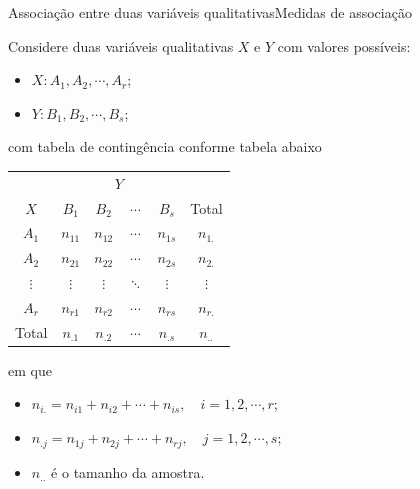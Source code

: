 \documentclass[
  10pt,
  ignorenonframetext,
]{beamer}
\begin{document}
\begin{frame}{Associação entre duas variáveis
qualitativas\newline Medidas de associação}
\protect\hypertarget{associauxe7uxe3o-entre-duas-variuxe1veis-qualitativasmedidas-de-associauxe7uxe3o-1}{}
\scriptsize

Considere duas variáveis qualitativas \(X\) e \(Y\) com valores
possíveis:

\begin{itemize}
    \item $X: A_1, A_2, \cdots, A_r$;
    \item $Y: B_1, B_2, \cdots, B_s$;
\end{itemize}

com tabela de contingência conforme tabela abaixo

\begin{table}[htbp]
    \centering
    \begin{tabular}{c|cccc|c}
        \toprule[0.05cm]
        & \multicolumn{4}{|c|}{$Y$} & \\ \cmidrule[0.05cm]{2-5}
        $X$ & $B_1$ & $B_2$ & $\cdots$ & $B_s$ & Total\\ \midrule[0.05cm]
        $A_1$ & $n_{11}$ & $n_{12}$ & $\cdots$ & $n_{1s}$ & $n_{1.}$\\
        $A_2$ & $n_{21}$ & $n_{22}$ & $\cdots$ & $n_{2s}$ & $n_{2.}$\\
        $\vdots$ & $\vdots$ & $\vdots$ & $\ddots$ & $\vdots$ & $\vdots$\\
        $A_r$ & $n_{r1}$ & $n_{r2}$ & $\cdots$ & $n_{rs}$ & $n_{r.} $\\ \midrule[0.05cm]
        Total & $n_{.1}$ & $n_{.2}$ & $\cdots$ & $n_{.s}$ & $n_{..}$\\
        \bottomrule[0.05cm]
    \end{tabular}
\end{table}

em que

\begin{itemize}
    \item $n_{i.} = n_{i1}+n_{i2}+\cdots+n_{is}, \quad i =1,2, \cdots, r$;
    \item $n_{.j} = n_{1j}+n_{2j}+\cdots+n_{rj}, \quad j =1,2, \cdots, s$;
    \item $n_{..}$ é o tamanho da amostra.
\end{itemize}

\normalsize
\end{frame}
\end{document}
